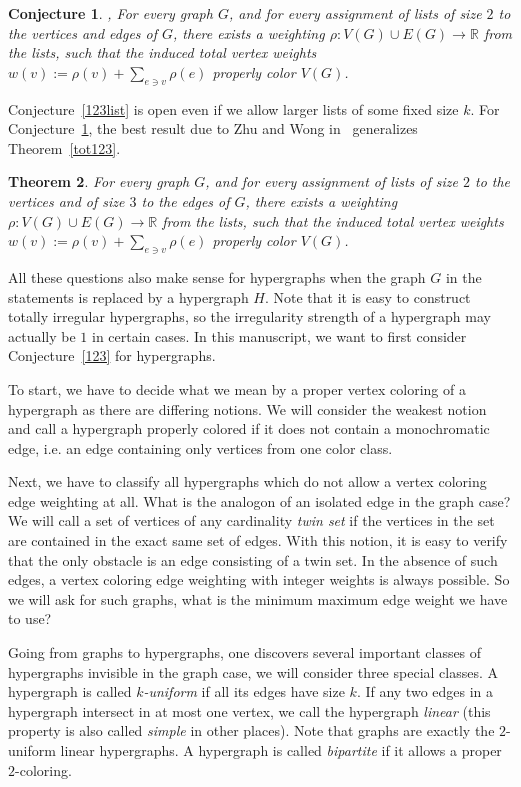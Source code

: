 \documentclass[reqno,12pt,epsf]{amsart}
\newtheorem{theorem}{Theorem}     %
\newtheorem{conjecture}[theorem]{Conjecture}
\def\omm{\rho}
\def\R{\mathbb{R}}
\begin{document}
\begin{conjecture}\label{12list}\cite{PW2},\cite{WZ}
For every graph $G$, and for every assignment of lists of size $2$ to the vertices and edges of $G$, there exists a weighting $\omm: V(G)\cup E(G)\to \R$ from the lists,
such that the induced total vertex weights $w(v):=\omm(v)+\sum_{e \ni v}\omm(e)$ properly color $V(G)$.
\end{conjecture}
Conjecture~\ref{123list} is open even if we allow larger lists of some fixed size $k$. For Conjecture~\ref{12list}, the best result due to Zhu and Wong in~\cite{ZW} generalizes Theorem~\ref{tot123}.
\begin{theorem}\label{tot123list}
For every graph $G$, and for every assignment of lists of size $2$ to the vertices and of size $3$ to the edges of $G$, there exists a weighting $\omm: V(G)\cup E(G)\to \R$ from the lists,
such that the induced total vertex weights $w(v):=\omm(v)+\sum_{e \ni v}\omm(e)$ properly color $V(G)$.
\end{theorem}
All these questions also make sense for hypergraphs when the graph $G$ in the statements is replaced by a hypergraph $H$.
Note that it is easy to construct totally irregular hypergraphs, so the irregularity strength of a hypergraph may actually be $1$ in certain cases. In this manuscript, we want to first consider Conjecture~\ref{123} for hypergraphs. 

To start, we have to decide what we mean by a proper vertex coloring of a hypergraph as there are differing notions. We will consider the weakest notion and call a hypergraph properly colored if it does not contain a monochromatic edge, i.e. an edge containing only vertices from one color class.

Next, we have to classify all hypergraphs which do not allow a vertex coloring edge weighting at all. What is the analogon of an isolated edge in the graph case? We will call a set of vertices of any cardinality {\em twin set} if the vertices in the set are contained in the exact same set of edges. With this notion, it is easy to verify that the only obstacle is an edge consisting of a twin set. In the absence of such edges, a vertex coloring edge weighting with integer weights is always possible. So we will ask for such graphs, what is the minimum maximum edge weight we have to use?

Going from graphs to hypergraphs, one discovers several important classes of hypergraphs invisible in the graph case, we will consider three special classes. A hypergraph is called {\em $k$-uniform} if all its edges have size $k$. If any two edges in a hypergraph intersect in at most one vertex, we call the hypergraph {\em linear} (this property is also called {\em simple} in other places). Note that graphs are exactly the $2$-uniform linear hypergraphs.
A hypergraph is called {\em bipartite} if it allows a proper $2$-coloring. 
\end{document}
